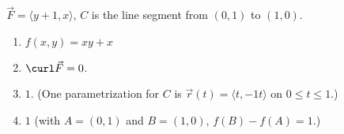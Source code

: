 {$\vec F = \langle y+1,x\rangle$, $C$ is the line segment from $(0,1)$ to $(1,0)$.
}
{\begin{enumerate}
\item		$f(x,y) = xy+x$
\item	$\curl \vec F = 0$.
\item		$1$. (One parametrization for $C$ is $\vec r(t) = \langle t,-1 t\rangle$ on $0\leq t\leq 1$.)
\item	$1$ (with $A = (0,1)$ and $B = (1,0)$, $f(B) - f(A) = 1$.)
\end{enumerate}
}

